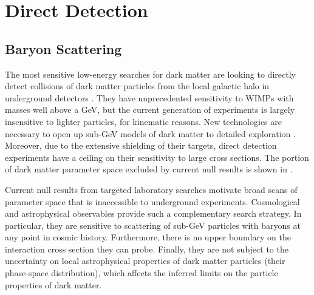\section{Direct Detection }
\label{sec:direct}

\subsection{Baryon Scattering }

The most sensitive low-energy searches for dark matter are looking to directly detect collisions of dark matter particles from the local galactic halo in underground detectors \citep{2013arXiv1310.8327C}. 
They have unprecedented sensitivity to WIMPs with masses well above a GeV, but the current generation of experiments is largely insensitive to lighter particles, for kinematic reasons. 
New technologies are necessary to open up sub-GeV models of dark matter to detailed exploration \citep{Battaglieri:2017aum}. 
Moreover, due to the extensive shielding of their targets, direct detection experiments have a ceiling on their sensitivity to large cross sections. 
The portion of dark matter parameter space excluded by current null results is shown in . 

Current null results from targeted laboratory searches motivate broad scans of parameter space that is inaccessible to underground experiments. Cosmological and astrophysical observables provide such a complementary search strategy. In particular, they are sensitive to scattering of sub-GeV particles with baryons at any point in cosmic history. Furthermore, there is no upper boundary on the interaction cross section they can probe. Finally, they are not subject to the uncertainty on local astrophysical properties of dark matter particles (their phase-space distribution), which affects the inferred limits on the particle properties of dark matter. 

